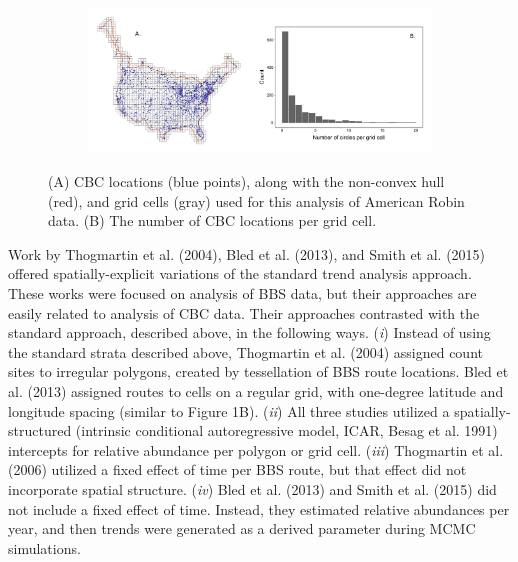 \documentclass[]{article}
\begin{document}
\begin{figure}[t]
  \centering
    \begin{subfigure}[t]{0.93\textwidth}
    \centering
    \includegraphics[width=\textwidth]{gridding} 
  \end{subfigure}
    \caption{(A) CBC locations (blue points), along with the non-convex hull (red), and grid cells (gray) used for this analysis of American Robin data. (B) The number of CBC locations per grid cell.}
\end{figure}

Work by Thogmartin et al. (2004), Bled et al. (2013), and Smith et al. (2015) offered spatially-explicit variations of the standard trend analysis approach. These works were focused on analysis of BBS data, but their approaches are easily related to analysis of CBC data. Their approaches contrasted with the standard approach, described above, in the following ways. (\textit{i}) Instead of using the standard strata described above, Thogmartin et al. (2004) assigned count sites to irregular polygons, created by tessellation of BBS route locations.  Bled et al. (2013) assigned routes to cells on a regular grid, with one-degree latitude and longitude spacing (similar to Figure 1B). (\textit{ii}) All three studies utilized a spatially-structured (intrinsic conditional autoregressive model, ICAR, Besag et al. 1991) intercepts for relative abundance per polygon or grid cell. (\textit{iii}) Thogmartin et al. (2006) utilized a fixed effect of time per BBS route, but that effect did not incorporate spatial structure. (\textit{iv}) Bled et al. (2013) and Smith et al. (2015) did not include a fixed effect of time. Instead, they estimated relative abundances per year, and then trends were generated as a derived parameter during MCMC simulations.
\end{document}

